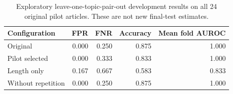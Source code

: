 \begin{table}[htbp]
\centering\small
\begin{tabular}{lrrrr}
\toprule
Configuration & FPR & FNR & Accuracy & Mean fold AUROC \\
\midrule
Original & 0.000 & 0.250 & 0.875 & 1.000 \\
Pilot selected & 0.000 & 0.333 & 0.833 & 1.000 \\
Length only & 0.167 & 0.667 & 0.583 & 0.833 \\
Without repetition & 0.000 & 0.250 & 0.875 & 1.000 \\
\bottomrule
\end{tabular}
\caption{Exploratory leave-one-topic-pair-out development results on all 24 original pilot articles. These are not new final-test estimates.}
\end{table}